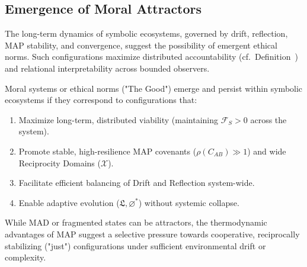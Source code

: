 \subsection{Emergence of Moral Attractors}
\label{subsec:bk9_emergence_of_moral_attractors}
The long-term dynamics of symbolic ecosystems, governed by drift, reflection, MAP stability, and convergence, suggest the possibility of emergent ethical norms. Such configurations maximize distributed accountability (cf.~Definition~) and relational interpretability across bounded observers.
\begin{proposition}
\label{prop:bk9_stability_conditions_for_the_good}
Moral systems or ethical norms ("The Good") emerge and persist within symbolic ecosystems if they correspond to configurations that:
\begin{enumerate}
    \item Maximize long-term, distributed viability (maintaining $\mathcal{F}_S > 0$ across the system).
    \item Promote stable, high-resilience MAP covenants ($\rho(C_{AB}) \gg 1$) and wide Reciprocity Domains ($\mathcal{X}$).
    \item Facilitate efficient balancing of Drift and Reflection system-wide.
    \item Enable adaptive evolution ($\mathfrak{L}, \varnothing^*$) without systemic collapse.
\end{enumerate}
While MAD or fragmented states can be attractors, the thermodynamic advantages of MAP suggest a selective pressure towards cooperative, reciprocally stabilizing ("just") configurations under sufficient environmental drift or complexity.
\end{proposition}
